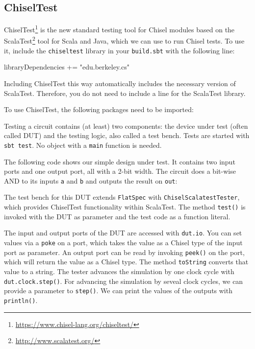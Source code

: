 \documentclass[%
    10pt,
    headinclude, footexclude,
    openright, %
    notitlepage,
    cleardoubleempty,
    headsepline,
    pointlessnumbers,
    bibtotoc, idxtotoc,
    ]{scrbook}
\newcommand{\code}[1]{{\small{\texttt{#1}}}}
\newcommand{\myref}[2]{\href{#1}{#2}}
\renewcommand{\myref}[2]{{#2}{\footnote{\url{#1}}}}
\begin{document}
\subsection{ChiselTest}


\myref{https://www.chisel-lang.org/chiseltest/}{ChiselTest} is the new standard testing tool 
for Chisel modules based on the \myref{http://www.scalatest.org/}{ScalaTest} tool for Scala 
and Java, which we can use to run Chisel tests.
To use it, include the \code{chiseltest} library in your \code{build.sbt} with the following line:

\begin{chisel}
libraryDependencies += "edu.berkeley.cs" %
\end{chisel}

\noindent Including ChiselTest this way automatically includes the necessary version of ScalaTest.
Therefore, you do not need to include a line for the ScalaTest library.

To use ChiselTest, the following packages need to be imported:


\noindent Testing a circuit contains (at least) two components: the device under test (often
called DUT) and the testing logic, also called a test bench. Tests are started with \code{sbt test}.
No object with a \code{main} function is needed.

The following code shows our simple design under test. It contains two input
ports and one output port, all with a 2-bit width. The circuit does a bit-wise AND
to its inputs \code{a} and \code{b} and outputs the result on \code{out}:


The test bench for this DUT extends \code{FlatSpec} with \code{ChiselScalatestTester},
which provides ChiselTest functionality within ScalaTest.
The method \code{test()} is invoked with the DUT as parameter and the test code as a function literal.



The input and output ports of the DUT are accessed with \code{dut.io}.
You can set values via a \code{poke} on a port, which takes the value as a Chisel type of the
input port as parameter.
An output port can be read by invoking \code{peek()} on the port, which will return
the value as a Chisel type. The method \code{toString} converts that value to a
string.
The tester advances the simulation by one clock cycle with \code{dut.clock.step()}.
For advancing the simulation by seveal clock cycles, we can provide a parameter to
\code{step()}.
We can print the values of the outputs with \code{println()}.
\end{document}
